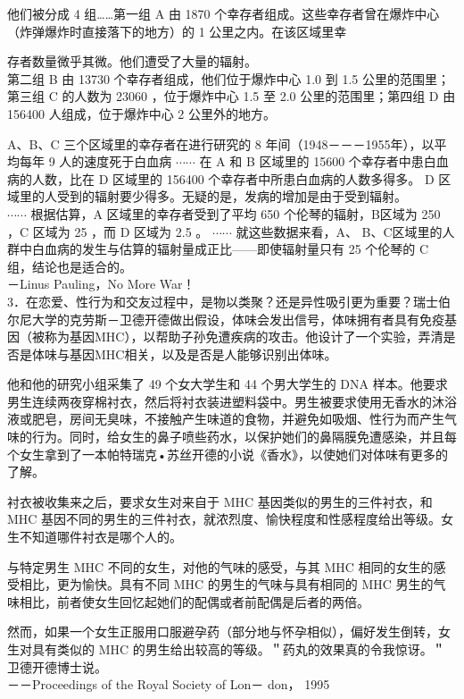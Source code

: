 他们被分成 4 组……第一组 A 由 1870 个幸存者组成。这些幸存者曾在爆炸中心（炸弹爆炸时直接落下的地方）的 1 公里之内。在该区域里幸

存者数量微乎其微。他们遭受了大量的辐射。\\
第二组 B 由 13730 个幸存者组成，他们位于爆炸中心 1.0 到 1.5 公里的范围里；第三组 C 的人数为 23060 ，位于爆炸中心 1.5 至 2.0 公里的范围里；第四组 D 由 156400 人组成，位于爆炸中心 2 公里外的地方。

A、B、C 三个区域里的幸存者在进行研究的 8 年间（1948－－－1955年），以平均每年 9 人的速度死于白血病 $\cdots \cdots$ 在 A 和 B 区域里的 15600 个幸存者中患白血病的人数，比在 D 区域里的 156400 个幸存者中所患白血病的人数多得多。 D 区域里的人受到的辐射要少得多。无疑的是，发病的增加是由于受到辐射。\\
$\cdots \cdots$ 根据估算，A 区域里的幸存者受到了平均 650 个伦琴的辐射，B区域为 250 ，C 区域为 25 ，而 D 区域为 2.5 。 $\cdots \cdots$ 就这些数据来看，A、 B、C区域里的人群中白血病的发生与估算的辐射量成正比——即使辐射量只有 25 个伦琴的 C 组，结论也是适合的。\\
－Linus Pauling，No More War！\\
3．在恋爱、性行为和交友过程中，是物以类聚？还是异性吸引更为重要？瑞士伯尔尼大学的克劳斯－卫德开德做出假设，体味会发出信号，体味拥有者具有免疫基因（被称为基因MHC），以帮助子孙免遭疾病的攻击。他设计了一个实验，弄清是否是体味与基因MHC相关，以及是否是人能够识别出体味。

他和他的研究小组采集了 49 个女大学生和 44 个男大学生的 DNA 样本。他要求男生连续两夜穿棉衬衣，然后将衬衣装进塑料袋中。男生被要求使用无香水的沐浴液或肥皂，房间无臭味，不接触产生味道的食物，并避免如吸烟、性行为而产生气味的行为。同时，给女生的鼻子喷些药水，以保护她们的鼻隔膜免遭感染，并且每个女生拿到了一本帕特瑞克•苏丝开德的小说《香水》，以使她们对体味有更多的了解。

衬衣被收集来之后，要求女生对来自于 MHC 基因类似的男生的三件衬衣，和 MHC 基因不同的男生的三件衬衣，就浓烈度、愉快程度和性感程度给出等级。女生不知道哪件衬衣是哪个人的。

与特定男生 MHC 不同的女生，对他的气味的感受，与其 MHC 相同的女生的感受相比，更为愉快。具有不同 MHC 的男生的气味与具有相同的 MHC 男生的气味相比，前者使女生回忆起她们的配偶或者前配偶是后者的两倍。

然而，如果一个女生正服用口服避孕药（部分地与怀孕相似），偏好发生倒转，女生对具有类似的 MHC 的男生给出较高的等级。＂药丸的效果真的令我惊讶。＂卫德开德博士说。\\
－－Proceedings of the Royal Society of Lon－ don， 1995

